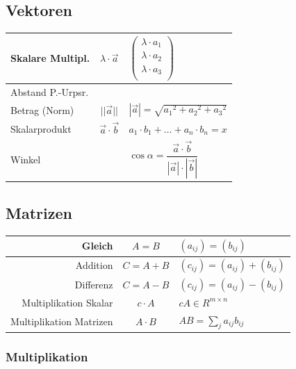 \documentclass[8pt,a4paper,landscape]{scrartcl}
\renewcommand{\arraystretch}{1.25}
\begin{document}
\begin{multicols*}{3}
\subsection*{Vektoren}
\renewcommand{\arraystretch}{1}
\begin{tabularx}{\columnwidth}{l|c|X}
	Skalare Multipl. & $ \lambda \cdot \vec{a}$ & 
	$\left(\begin{array}{rrr}                       \lambda \cdot a_1\\
	\lambda \cdot a_2\\
	\lambda \cdot a_3\\                 
	\end{array}\right)$\\ \hline
	Abstand P.-Urpsr. & \\
	Betrag (Norm) & $ ||\vec{a}||$ & 
	$|\vec{a}| = \sqrt{{a_1}^2 + {a_2}^2 + {a_3}^2}$\\ \hline
	Skalarprodukt & $\vec{a}\cdot\vec{b}$ & $a_1 \cdot b_1 + \ldots + a_n \cdot b_n = x$ \\ \hline
	Winkel &  & $\cos \alpha = \dfrac{\vec{a} \cdot \vec{b}}{|\vec{a}| \cdot |\vec{b}|}$ \\ \hline
\end{tabularx}

\subsection*{Matrizen}
\begin{tabularx}{\columnwidth}{r|c|X}
	Gleich & $ A = B $ & $ \left(a_{ij}\right) = \left(b_{ij}\right)$ \\ \hline
	Addition & $ C = A + B $ & $ \left(c_{ij}\right) = \left(a_{ij}\right) + \left(b_{ij}\right) $ \\ \hline
	Differenz & $ C = A - B $ &  $ \left(c_{ij}\right) = \left(a_{ij}\right) - \left(b_{ij}\right) $ \\ \hline
	Multiplikation Skalar & $ c \cdot A $ & $ cA \in R^{m \times n} $ \\ \hline
	Multiplikation Matrizen & $ A \cdot B $ & $ AB = \sum_{j} a_{ij}b_{ij} $
\end{tabularx}

\subsubsection*{Multiplikation}


\end{multicols*}
\end{document}
